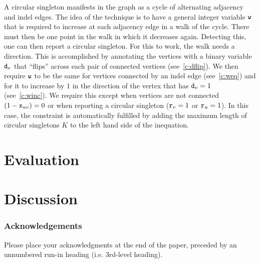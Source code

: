 \documentclass[runningheads]{llncs}
\begin{document}
A circular singleton manifests in the graph as a cycle of alternating adjacency and indel edges. The idea of the technique is to have a general integer variable ${\texttt{w}}$ that is required to increase at each adjacency edge in a walk of the cycle. There must then be one point in the walk in which it decreases again. Detecting this, one can then report a circular singleton. For this to work, the walk needs a direction. This is accomplished by annotating the vertices with a binary variable ${\texttt{d}}_v$ that ``flips'' across each pair of connected vertices (see~\ref{c:dflip}). We then require ${\texttt{w}}$ to be the same for vertices connected by an indel edge (see~\ref{c:weq}) and for it to increase by $1$ in the direction of the vertex that has ${\texttt{d}}_v=1$ (see~\ref{c:winc}). We require this except when vertices are not connected $(1-{\texttt{x}}_{uv})=0$ or when reporting a circular singleton (${\texttt{r}}_v=1$ or ${\texttt{r}}_u=1$). In this case, the constraint is automatically fulfilled by adding the maximum length of circular singletons $K$ to the left hand side of the inequation.





\section{Evaluation}
\section{Discussion}



\subsubsection{Acknowledgements} Please place your acknowledgments at
the end of the paper, preceded by an unnumbered run-in heading (i.e.
3rd-level heading).

%
%
%


\end{document}
